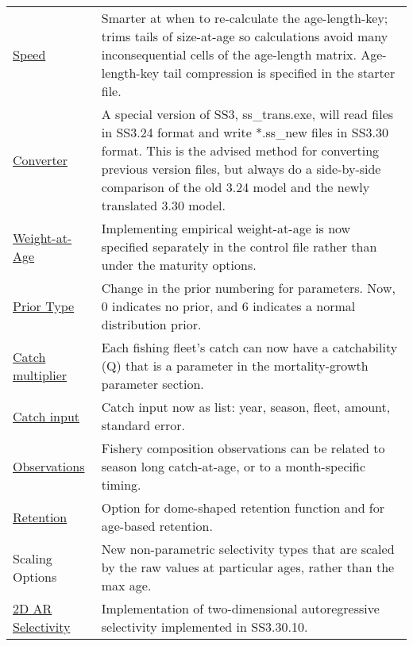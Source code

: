 \begin{center}
{\begin{longtable}{p{1.75cm} p{9.5cm}}
		\multicolumn{1}{l}{\hyperlink{ALK}{Speed}} & 
			    Smarter at when to re-calculate the age-length-key; trims tails of size-at-age so calculations avoid many inconsequential cells of the age-length matrix. Age-length-key tail compression is specified in the starter file.\\
		
		\multicolumn{1}{l}{\hyperlink{Convert} {Converter}} & 
			    A special version of SS3, ss\_trans.exe, will read files in SS3.24 format and write *.ss\_new files in SS3.30 format.  This is the advised method for converting previous version files, but always do a side-by-side comparison of the old 3.24 model and the newly translated 3.30 model.\\

		\multicolumn{1}{l}{\hyperlink{WAAparm} {Weight-at-Age}} & Implementing empirical weight-at-age is now specified separately in the control file rather than under the maturity options.\\

		\multicolumn{1}{l}{\hyperlink{Priors}{Prior Type}} & Change in the prior numbering for parameters.  Now, 0 indicates no prior, and 6 indicates a normal distribution prior.\\
		
		\multicolumn{1}{l}{\hyperlink{CatchMult}{Catch multiplier}} & 
				Each fishing fleet's catch can now have a catchability (Q) that is a parameter in the mortality-growth parameter section.\\
				
		\multicolumn{1}{l}{\hyperlink{CatchFormat}{Catch input}} & 
				Catch input now as list:  year, season, fleet, amount, standard error. \\
				
		\multicolumn{1}{l}{\hyperlink{CompTiming}{Observations}} & 
				Fishery composition observations can be related to season long catch-at-age, or to a month-specific timing.\\
		
		\multicolumn{1}{l}{\hyperlink{DomeRetention}{Retention}} & 
				Option for dome-shaped retention function and for age-based retention. \\

		\multicolumn{1}{l}{Scaling Options} & 	
				New non-parametric selectivity types that are scaled by the raw values at particular ages, rather than the max age.\\
		\multicolumn{1}{l}{\hyperlink{2DAR}{2D AR Selectivity}} &
				Implementation of two-dimensional autoregressive selectivity implemented in SS3.30.10.\\


\end{longtable}}
\end{center}
